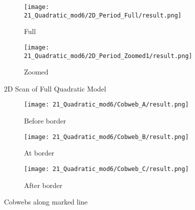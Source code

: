 \begin{figure}
	\centering
	\begin{subfigure}{0.4\textwidth}
		\centering
		\texttt{[image: 21\_Quadratic\_mod6/2D\_Period\_Full/result.png]}
		\caption{Full}
		\label{fig:quadratic.full.2d.full}
	\end{subfigure}
	\begin{subfigure}{0.4\textwidth}
		\centering
		\texttt{[image: 21\_Quadratic\_mod6/2D\_Period\_Zoomed1/result.png]}
		\caption{Zoomed}
		\label{fig:quadratic.full.2d.z1}
	\end{subfigure}
	\caption{2D Scan of Full Quadratic Model}
\end{figure}

\begin{figure}
	\centering
	\begin{subfigure}{0.3\textwidth}
		\centering
		\texttt{[image: 21\_Quadratic\_mod6/Cobweb\_A/result.png]}
		\caption{Before border}
		\label{fig:quad.full.CobwebA}
	\end{subfigure}
	\begin{subfigure}{0.3\textwidth}
		\centering
		\texttt{[image: 21\_Quadratic\_mod6/Cobweb\_B/result.png]}
		\caption{At border}
		\label{fig:quad.full.CobwebB}
	\end{subfigure}
	\begin{subfigure}{0.3\textwidth}
		\centering
		\texttt{[image: 21\_Quadratic\_mod6/Cobweb\_C/result.png]}
		\caption{After border}
		\label{fig:quad.full.CobwebC}
	\end{subfigure}
	\caption{Cobwebs along marked line}
	\label{fig:quad.full.Cobwebs}
\end{figure}
